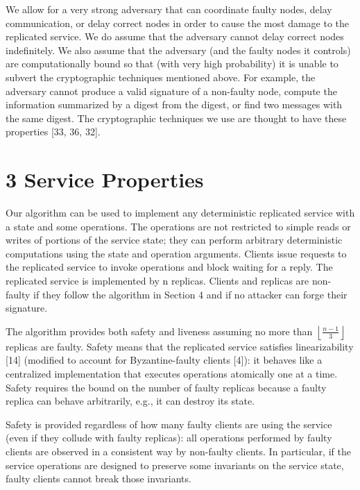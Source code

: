 \documentclass[
]{article}
\begin{document}
We allow for a very strong adversary that can coordinate faulty nodes,
delay communication, or delay correct nodes in order to cause the most
damage to the replicated service. We do assume that the adversary cannot
delay correct nodes indefinitely. We also assume that the adversary (and
the faulty nodes it controls) are computationally bound so that (with
very high probability) it is unable to subvert the cryptographic
techniques mentioned above. For example, the adversary cannot produce a
valid signature of a non-faulty node, compute the information summarized
by a digest from the digest, or find two messages with the same digest.
The cryptographic techniques we use are thought to have these properties
{[}33, 36, 32{]}.

\section{3 Service Properties}\label{service-properties}

Our algorithm can be used to implement any deterministic replicated
service with a state and some operations. The operations are not
restricted to simple reads or writes of portions of the service state;
they can perform arbitrary deterministic computations using the state
and operation arguments. Clients issue requests to the replicated
service to invoke operations and block waiting for a reply. The
replicated service is implemented by n replicas. Clients and replicas
are non-faulty if they follow the algorithm in Section 4 and if no
attacker can forge their signature.

The algorithm provides both safety and liveness assuming no more than
\(\left\lfloor\frac{n-1}{3}\right\rfloor\) replicas are faulty. Safety
means that the replicated service satisfies linearizability {[}14{]}
(modified to account for Byzantine-faulty clients {[}4{]}): it behaves
like a centralized implementation that executes operations atomically
one at a time. Safety requires the bound on the number of faulty
replicas because a faulty replica can behave arbitrarily, e.g., it can
destroy its state.

Safety is provided regardless of how many faulty clients are using the
service (even if they collude with faulty replicas): all operations
performed by faulty clients are observed in a consistent way by
non-faulty clients. In particular, if the service operations are
designed to preserve some invariants on the service state, faulty
clients cannot break those invariants.
\end{document}
